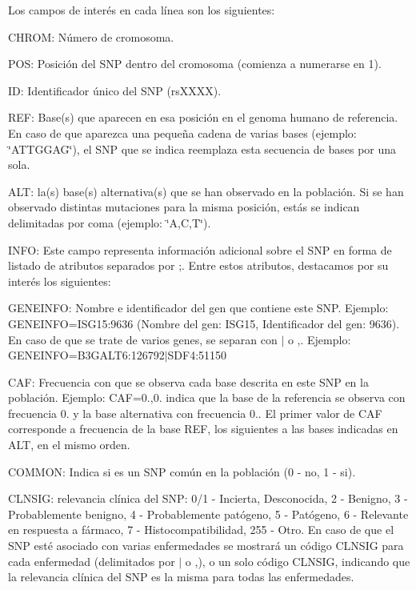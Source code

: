 Los campos de interés en cada línea son los siguientes\+: \begin{DoxyItemize}
\item C\+H\+R\+OM\+: Número de cromosoma. \item P\+OS\+: Posición del S\+NP dentro del cromosoma (comienza a numerarse en 1). \item ID\+: Identificador único del S\+NP (\textquotesingle{}rs\+X\+X\+XX\textquotesingle{}). \item R\+EF\+: Base(s) que aparecen en esa posición en el genoma humano de referencia. En caso de que aparezca una pequeña cadena de varias bases (ejemplo\+: \char`\"{}\+A\+T\+T\+G\+G\+A\+G\char`\"{}), el S\+NP que se indica reemplaza esta secuencia de bases por una sola. \item A\+LT\+: la(s) base(s) alternativa(s) que se han observado en la población. Si se han observado distintas mutaciones para la misma posición, estás se indican delimitadas por coma (ejemplo\+: \char`\"{}\+A,\+C,\+T\char`\"{}). \item I\+N\+FO\+: Este campo representa información adicional sobre el S\+NP en forma de listado de atributos separados por \textquotesingle{};\textquotesingle{}. Entre estos atributos, destacamos por su interés los siguientes\+:
\begin{DoxyItemize}
\item G\+E\+N\+E\+I\+N\+FO\+: Nombre e identificador del gen que contiene este S\+NP. Ejemplo\+: G\+E\+N\+E\+I\+N\+FO=I\+S\+G15\+:9636 (Nombre del gen\+: I\+S\+G15, Identificador del gen\+: 9636). En caso de que se trate de varios genes, se separan con \textquotesingle{}$\vert$\textquotesingle{} o \textquotesingle{},\textquotesingle{}. Ejemplo\+: G\+E\+N\+E\+I\+N\+FO=B3\+G\+A\+L\+T6\+:126792$\vert$\+S\+D\+F4\+:51150
\item C\+AF\+: Frecuencia con que se observa cada base descrita en este S\+NP en la población. Ejemplo\+: C\+AF=0.,0. indica que la base de la referencia se observa con frecuencia 0. y la base alternativa con frecuencia 0.. El primer valor de C\+AF corresponde a frecuencia de la base R\+EF, los siguientes a las bases indicadas en A\+LT, en el mismo orden.
\item C\+O\+M\+M\+ON\+: Indica si es un S\+NP común en la población (0 -\/ no, 1 -\/ si).
\item C\+L\+N\+S\+IG\+: relevancia clínica del S\+NP\+: 0/1 -\/ Incierta, Desconocida, 2 -\/ Benigno, 3 -\/ Probablemente benigno, 4 -\/ Probablemente patógeno, 5 -\/ Patógeno, 6 -\/ Relevante en respuesta a fármaco, 7 -\/ Histocompatibilidad, 255 -\/ Otro. En caso de que el S\+NP esté asociado con varias enfermedades se mostrará un código C\+L\+N\+S\+IG para cada enfermedad (delimitados por \textquotesingle{}$\vert$\textquotesingle{} o \textquotesingle{},\textquotesingle{}), o un solo código C\+L\+N\+S\+IG, indicando que la relevancia clínica del S\+NP es la misma para todas las enfermedades.

\end{DoxyItemize}
\end{DoxyItemize}
